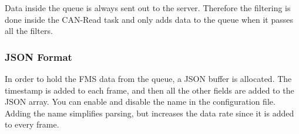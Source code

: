 Data inside the queue is always sent out to the server. Therefore the filtering is done inside the CAN-Read task and only adds data to the queue when it passes all the filters.  

\subsubsection{JSON Format}
In order to hold the FMS data from the queue, a JSON buffer is allocated. The timestamp is added to each frame, and then all the other fields are added to the JSON array. You can enable and disable the name in the configuration file. Adding the name simplifies parsing, but increases the data rate since it is added to every frame.

\begin{table}[h!]
    \begin{center}
\end{center}
\end{table}
